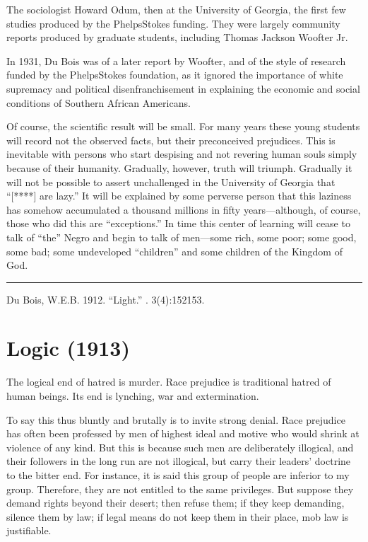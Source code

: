 \documentclass[letterpaper,10pt,english]{jupyterBook}
\begin{document}
\begin{sphinxShadowBox}
\sphinxstylesidebartitle{}

\sphinxAtStartPar
The sociologist Howard Odum, then at the University of Georgia,  the first few studies produced by the Phelps\sphinxhyphen{}Stokes funding. They were largely community reports produced by graduate students, including Thomas Jackson Woofter Jr.

\sphinxAtStartPar
In 1931, Du Bois was  of a later report by Woofter, and of the style of research funded by the Phelps\sphinxhyphen{}Stokes foundation, as it  ignored the importance of white supremacy and political disenfranchisement in explaining the economic and social conditions of Southern African Americans.
\end{sphinxShadowBox}

\sphinxAtStartPar
Of course, the scientific result will be small. For many years these young students will record not the observed facts, but their preconceived prejudices. This is inevitable with persons who start despising and not revering human souls simply because of their humanity. Gradually, however, truth will triumph.	Gradually it will not be possible to assert unchallenged in the University of Geor­gia that “{[}****{]} are lazy.” It will be explained by some perverse per­son that this laziness has somehow accumulated a thousand millions in fifty years—although, of course, those who did this are “exceptions.” In time this center of learning will cease to talk of “the” Negro and begin to talk of men—some rich, some poor; some good, some bad; some undeveloped “children” and some children of the Kingdom of God.


\bigskip\hrule\bigskip


\sphinxAtStartPar
{} Du Bois, W.E.B. 1912. “Light.” . 3(4):152\sphinxhyphen{}153.


\section{Logic (1913)}
\label{\detokenize{Volumes/06/02/logic:logic-1913}}\label{\detokenize{Volumes/06/02/logic::doc}}
\sphinxAtStartPar
The logical end of hatred is murder. Race prejudice is traditional hatred of human beings. Its end is lynching, war and extermination.

\sphinxAtStartPar
To say this thus bluntly and brutally is to invite strong denial. Race prejudice has often been professed by men of highest ideal and motive who would shrink at violence of any kind. But this is because such men are deliberately illogical, and their followers in the long run are not illogical, but carry their leaders’ doctrine to the bitter end. For instance, it is said this group of people are inferior to my group. Therefore, they are not entitled to the same privileges. But suppose they demand rights beyond their desert; then refuse them; if they keep demanding, silence them by law; if legal means do not keep them in their place, mob law is justifiable.
\end{document}
